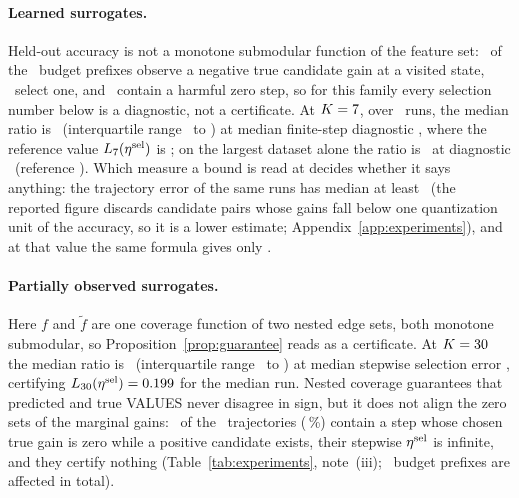 \paragraph{Learned surrogates.}
Held-out accuracy is not a monotone submodular function of the feature set:
\EOneNegCandPrefixes\ of the \EOnePrefixTotal\ budget prefixes observe a
negative true candidate gain at a visited state, \EOneSelectedNegPrefixes\
select one, and \EOneHarmfulZeroPrefixes\ contain a harmful zero step, so
for this family every selection number below is a diagnostic, not a
certificate.  At $K=7$, over \EOneNumRunsKMain\ runs, the median
ratio is \EOneKMainRatioMedian\ (interquartile range \EOneKMainRatioLoQ\ to
\EOneKMainRatioHiQ) at median finite-step diagnostic
\EOneKMainEtaSelMedian, where the reference value
$L_{7}(\eta^{\mathrm{sel}})$ is \EOneKMainBound; on the largest dataset alone
the ratio is \EOneAirlineRatioMedian\ at diagnostic
\EOneAirlineEtaSelMedian\ (reference \EOneAirlineBound).  Which measure a
bound is read at decides whether it says anything: the trajectory error of
the same runs has median at least \EOneKMainEtaTrMedian\ (the reported
figure discards candidate pairs whose gains fall below one quantization
unit of the accuracy, so it is a lower estimate;
Appendix~\ref{app:experiments}), and at that value the same formula gives
only \EOneKMainEtaTrBound.

\paragraph{Partially observed surrogates.}
Here $f$ and $\tilde f$ are one coverage function of two nested edge sets,
both monotone submodular, so Proposition~\ref{prop:guarantee} reads as a
certificate.  At $K=30$ the median ratio is \ETwoKMainRatioMedian\
(interquartile range \ETwoKMainRatioLoQ\ to \ETwoKMainRatioHiQ) at median
stepwise selection error \ETwoKMainEtaSelMedian, certifying
$L_{30}(\eta^{\mathrm{sel}})=0.199$ for the median run.
Nested coverage guarantees that predicted and true VALUES never disagree in
sign, but it does not align the zero sets of the marginal gains:
\ETwoHarmfulZeroTrajKMain\ of the \ETwoNumTrajectories\ trajectories
(\ETwoHarmfulZeroTrajPctKMain\,\%) contain a step whose chosen true gain is
zero while a positive candidate exists, their stepwise $\eta^{\mathrm{sel}}$ is
infinite, and they certify nothing
(Table~\ref{tab:experiments}, note~(iii); \ETwoHarmfulZeroPrefixes\ budget
prefixes are affected in total).


